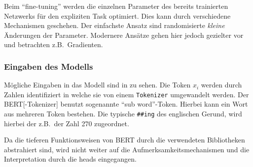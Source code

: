 Beim \enquote{fine-tuning} werden die einzelnen Parameter des bereits trainierten Netzwerks
für den expliziten Task optimiert. \autocite{towardsdatascience:what-exactly-happens-when-we-fine-tune-bert}
Dies kann durch verschiedene Mechanismen geschehen.
Der einfachste Ansatz sind randomisierte \emph{kleine} Änderungen der Parameter.
Modernere Ansätze gehen hier jedoch gezielter vor
und betrachten z.B.\, Gradienten.

\subsubsection{Eingaben des Modells}
Mögliche Eingaben in das Modell sind in 
zu sehen.
Die Token \(x_i\) werden durch Zahlen identifiziert
in welche sie von einem \texttt{Tokenizer} umgewandelt werden.
Der \gls{BERT}[-Tokenizer] benutzt sogenannte \foreignquote{english}{sub word}-Token.
Hierbei kann ein Wort aus mehreren Token bestehen.
Die typische \texttt{\#\#ing} des englischen Gerund,
wird hierbei der z.B.\, der Zahl 270 zugeordnet.

Da die tieferen Funktionsweisen von \gls{BERT}
durch die verwendeten Bibliotheken abstrahiert sind,
wird nicht weiter auf die Aufmerksamkeitsmechanismen 
und die Interpretation durch die heads
eingegangen.